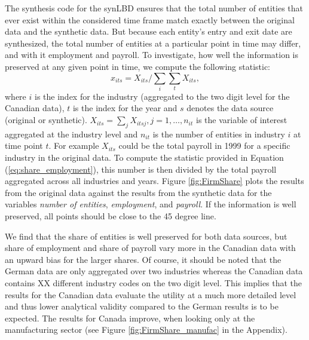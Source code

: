 The synthesis code for the synLBD ensures that the total number of entities that ever exist within the considered time frame  match exactly between the original data and the synthetic data. But because each entity's entry and exit date are synthesized, the total number of entities at a particular point in time may differ, and with it employment and payroll. To investigate, how well the information is preserved at any given point in time, we compute the following statistic:
\begin{equation}
    \label{eq:share_employment}
x_{its} = X_{its}/\sum_{i} \sum_{t} X_{its}, 
\end{equation}
where $i$ is the index for the industry (aggregated to the two digit level for the Canadian data), $t$ is the index for the year and $s$ denotes the data source (original or synthetic). $X_{its}=\sum_j X_{itsj}, j=1,\ldots,n_{it}$ is the variable of interest aggregated at the industry level and $n_{it}$ is the number of entities in industry $i$ at time point $t$. For example $X_{its}$ could be the total payroll in 1999 for a specific industry in the original data. To compute the statistic provided in Equation (\ref{eq:share_employment}), this number is then divided by the total payroll aggregated across all industries and years.
Figure \ref{fig:FirmShare} plots the results from the original data against the results from the synthetic data for the variables \textit{number of entities}, \textit{employment}, and \textit{payroll}. If the information is well preserved, all points should be close to the 45 degree line. 

We find that the share of entities is well preserved for both data sources, but share of employment and share of payroll vary more in the Canadian data with an upward bias for the larger shares. Of course, it should be noted that the German data are only aggregated over two industries whereas the Canadian data contains XX different industry codes on the two digit level. This implies that the results for the Canadian data evaluate the utility at a much more detailed level and thus lower analytical validity compared to the German results is to be expected. The results for Canada improve, when looking only at the manufacturing sector (see Figure \ref{fig:FirmShare_manufac} in the Appendix).



